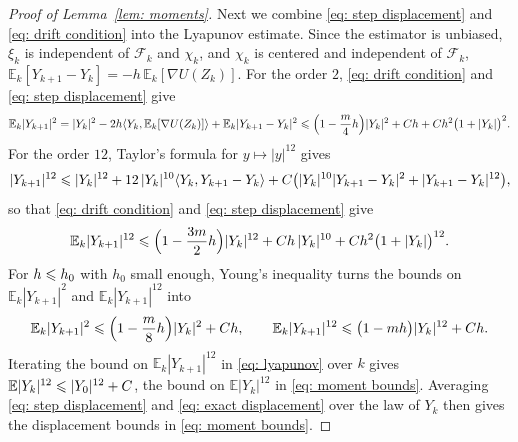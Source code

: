 \begin{proof}[Proof of Lemma~\ref{lem: moments}]
    Next we combine \eqref{eq: step displacement} and \eqref{eq: drift condition} into the Lyapunov estimate. Since the estimator is unbiased, $\xi_k$ is independent of $\mathcal F_k$ and $\chi_k$, and $\chi_k$ is centered and independent of $\mathcal F_k$, $\mathbb E_k[Y_{k+1} - Y_k] = -h\, \mathbb E_k[\nabla U(Z_k)]$. For the order $2$, \eqref{eq: drift condition} and \eqref{eq: step displacement} give
    \begin{equation*}
        \mathbb E_k |Y_{k+1}|^2 = |Y_k|^2 - 2h \langle Y_k, \mathbb E_k [\nabla U(Z_k)] \rangle + \mathbb E_k |Y_{k+1} - Y_k|^2 \leqslant \Bigl( 1 - \frac m4 h \Bigr) |Y_k|^2 + C h + C h^2 \bigl( 1 + |Y_k| \bigr)^2 .
    \end{equation*}
    For the order $12$, Taylor's formula for $y \mapsto |y|^{12}$ gives
    \begin{equation*}
        |Y_{k+1}|^{12} \leqslant |Y_k|^{12} + 12\, |Y_k|^{10} \langle Y_k, Y_{k+1} - Y_k \rangle + C \bigl( |Y_k|^{10} |Y_{k+1} - Y_k|^2 + |Y_{k+1} - Y_k|^{12} \bigr) ,
    \end{equation*}
    so that \eqref{eq: drift condition} and \eqref{eq: step displacement} give
    \begin{equation*}
        \mathbb E_k |Y_{k+1}|^{12} \leqslant \Bigl( 1 - \frac{3m}{2} h \Bigr) |Y_k|^{12} + C h\, |Y_k|^{10} + C h^2 \bigl( 1 + |Y_k| \bigr)^{12} .
    \end{equation*}
    For $h \leqslant h_0$ with $h_0$ small enough, Young's inequality turns the bounds on $\mathbb E_k |Y_{k+1}|^2$ and $\mathbb E_k |Y_{k+1}|^{12}$ into
    \begin{equation}
        \mathbb E_k |Y_{k+1}|^{2} \leqslant \Bigl( 1 - \frac m8 h \Bigr) |Y_k|^{2} + C h , \qquad
        \mathbb E_k |Y_{k+1}|^{12} \leqslant \bigl( 1 - m h \bigr) |Y_k|^{12} + C h .
        \label{eq: lyapunov}
    \end{equation}
    Iterating the bound on $\mathbb E_k |Y_{k+1}|^{12}$ in \eqref{eq: lyapunov} over $k$ gives $\mathbb E |Y_k|^{12} \leqslant |Y_0|^{12} + C$, the bound on $\mathbb E|Y_k|^{12}$ in \eqref{eq: moment bounds}. Averaging \eqref{eq: step displacement} and \eqref{eq: exact displacement} over the law of $Y_k$ then gives the displacement bounds in \eqref{eq: moment bounds}.
\end{proof}

